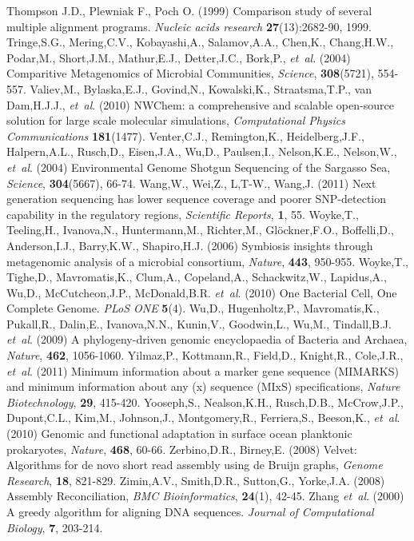 \begin{thebibliography}{}
Thompson J.D., Plewniak F., Poch O. (1999) Comparison study of several multiple alignment programs.
\textit{Nucleic acids research} \textbf{27}(13):2682-90, 1999.
 Tringe,S.G., Mering,C.V., Kobayashi,A., Salamov,A.A., Chen,K., Chang,H.W., Podar,M., Short,J.M., Mathur,E.J., Detter,J.C., Bork,P., {\it et~al}. (2004) Comparitive Metagenomics of Microbial Communities, {\it Science}, {\bf 308}(5721), 554-557.
 Valiev,M., Bylaska,E.J., Govind,N., Kowalski,K., Straatsma,T.P., van Dam,H.J.J., {\it et~al}. (2010) NWChem: a comprehensive and scalable open-source solution for large scale molecular simulations, {\it Computational Physics Communications} {\bf 181}(1477).
 Venter,C.J., Remington,K., Heidelberg,J.F., Halpern,A.L., Rusch,D., Eisen,J.A., Wu,D., Paulsen,I., Nelson,K.E., Nelson,W., {\it et~al}. (2004) Environmental Genome Shotgun Sequencing of the Sargasso Sea, {\it Science}, {\bf 304}(5667), 66-74.
 Wang,W., Wei,Z., L,T-W., Wang,J. (2011) Next generation sequencing has lower sequence coverage and poorer SNP-detection capability in the regulatory regions, {\it Scientific Reports}, {\bf 1}, 55.
 Woyke,T., Teeling,H., Ivanova,N., Huntermann,M., Richter,M., Glöckner,F.O., Boffelli,D., Anderson,I.J., Barry,K.W., Shapiro,H.J. (2006) Symbiosis insights through metagenomic analysis of a microbial consortium, {\it Nature}, {\bf 443}, 950-955.
 Woyke,T., Tighe,D., Mavromatis,K., Clum,A., Copeland,A., Schackwitz,W., Lapidus,A., Wu,D., McCutcheon,J.P., McDonald,B.R. {\it et~al}. (2010) One Bacterial Cell, One Complete Genome. {\it PLoS ONE} {\bf 5}(4).
  Wu,D., Hugenholtz,P., Mavromatis,K., Pukall,R., Dalin,E., Ivanova,N.N., Kunin,V., Goodwin,L., Wu,M., Tindall,B.J. {\it et~al}. (2009) A phylogeny-driven genomic encyclopaedia of Bacteria and Archaea, {\it Nature}, {\bf 462}, 1056-1060.
 Yilmaz,P., Kottmann,R., Field,D., Knight,R., Cole,J.R., {\it et~al}. (2011) Minimum information about a marker gene sequence (MIMARKS) and minimum information about any (x) sequence (MIxS) specifications, {\it Nature Biotechnology}, {\bf 29}, 415-420.
 Yooseph,S., Nealson,K.H., Rusch,D.B., McCrow,J.P., Dupont,C.L., Kim,M., Johnson,J., Montgomery,R., Ferriera,S., Beeson,K., {\it et~al}. (2010) Genomic and functional adaptation in surface ocean planktonic prokaryotes, {\it Nature}, {\bf 468}, 60-66.
 Zerbino,D.R., Birney,E. (2008) Velvet: Algorithms for de novo short read assembly using de Bruijn graphs, {\it Genome Research}, {\bf 18}, 821-829.
 Zimin,A.V., Smith,D.R., Sutton,G., Yorke,J.A. (2008) Assembly Reconciliation, {\it BMC Bioinformatics}, {\bf 24}(1), 42-45.
Zhang \textit{et~al}. (2000) A greedy algorithm for aligning DNA sequences. \textit{Journal of Computational Biology}, \textbf{7}, 203-214.

\end{thebibliography}

